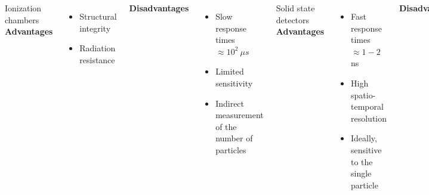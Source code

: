 \documentclass[aspectratio=169]{beamer}
\begin{document}
\begin{frame}
\begin{columns}
\begin{center}
			\end{center}
			{\color{blue} Ionization chambers}
			\newline
			\textbf{Advantages}
			\begin{itemize}
				\item Structural integrity
				\item Radiation resistance
			\end{itemize}
			\textbf{Disadvantages}
			\begin{itemize}
				\item Slow response times $\approx 10^2\:\mu s$
				\item Limited sensitivity
				\item Indirect measurement of the number of particles
			\end{itemize}
			{\color{blue} Solid state detectors}
			\newline
			\textbf{Advantages}
			\begin{itemize}
				\item Fast response times $\approx 1-2$ ns
				\item High spatio-temporal resolution
				\item Ideally, sensitive to the single particle
			\end{itemize}
			\textbf{Disadvantages}
			\begin{itemize}
				\item Complex and fast readout electronics
				\item Damage from radiation
			\end{itemize}
		\end{columns}
	\end{frame}
\end{document}
